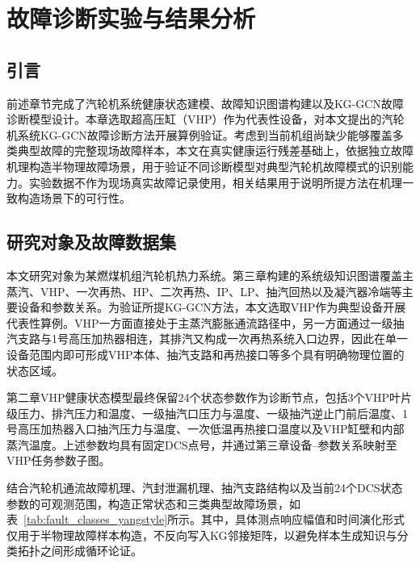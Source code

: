 \section{故障诊断实验与结果分析}
\label{sec:experiments}

\subsection{引言}

前述章节完成了汽轮机系统健康状态建模、故障知识图谱构建以及KG-GCN故障诊断模型设计。本章选取超高压缸（VHP）作为代表性设备，对本文提出的汽轮机系统KG-GCN故障诊断方法开展算例验证。考虑到当前机组尚缺少能够覆盖多类典型故障的完整现场故障样本，本文在真实健康运行残差基础上，依据独立故障机理构造半物理故障场景，用于验证不同诊断模型对典型汽轮机故障模式的识别能力。实验数据不作为现场真实故障记录使用，相关结果用于说明所提方法在机理一致构造场景下的可行性。

\subsection{研究对象及故障数据集}
\label{subsec:fault_dataset_v4}

本文研究对象为某燃煤机组汽轮机热力系统。第三章构建的系统级知识图谱覆盖主蒸汽、VHP、一次再热、HP、二次再热、IP、LP、抽汽回热以及凝汽器冷端等主要设备和参数关系。为验证所提KG-GCN方法，本文选取VHP作为典型设备开展代表性算例。VHP一方面直接处于主蒸汽膨胀通流路径中，另一方面通过一级抽汽支路与1号高压加热器相连，其排汽又构成一次再热系统入口边界，因此在单一设备范围内即可形成VHP本体、抽汽支路和再热接口等多个具有明确物理位置的状态区域。

第二章VHP健康状态模型最终保留24个状态参数作为诊断节点，包括3个VHP叶片级压力、排汽压力和温度、一级抽汽口压力与温度、一级抽汽逆止门前后温度、1号高压加热器入口抽汽压力与温度、一次低温再热接口温度以及VHP缸壁和内部蒸汽温度。上述参数均具有固定DCS点号，并通过第三章设备--参数关系映射至VHP任务参数子图。

结合汽轮机通流故障机理、汽封泄漏机理、抽汽支路结构以及当前24个DCS状态参数的可观测范围，构造正常状态和三类典型故障场景，如表~\ref{tab:fault_classes_yangstyle}所示。其中，具体测点响应幅值和时间演化形式仅用于半物理故障样本构造，不反向写入KG邻接矩阵，以避免样本生成知识与分类拓扑之间形成循环论证。

